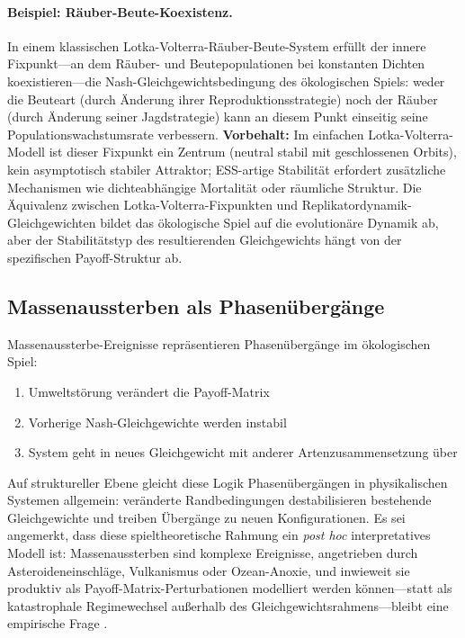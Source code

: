 \documentclass[12pt,a4paper]{article}
\theoremstyle{remark}
\begin{document}
\paragraph{Beispiel: R\"auber-Beute-Koexistenz.}
In einem klassischen Lotka-Volterra-R\"auber-Beute-System erf\"ullt der innere Fixpunkt---an dem R\"auber- und Beutepopulationen bei konstanten Dichten koexistieren---die Nash-Gleichgewichtsbedingung des \"okologischen Spiels: weder die Beuteart (durch \"Anderung ihrer Reproduktionsstrategie) noch der R\"auber (durch \"Anderung seiner Jagdstrategie) kann an diesem Punkt einseitig seine Populationswachstumsrate verbessern. \textbf{Vorbehalt:} Im einfachen Lotka-Volterra-Modell ist dieser Fixpunkt ein Zentrum (neutral stabil mit geschlossenen Orbits), kein asymptotisch stabiler Attraktor; ESS-artige Stabilit\"at erfordert zus\"atzliche Mechanismen wie dichteabh\"angige Mortalit\"at oder r\"aumliche Struktur. Die \"Aquivalenz zwischen Lotka-Volterra-Fixpunkten und Replikatordynamik-Gleichgewichten \citep{HofbauerSigmund1998} bildet das \"okologische Spiel auf die evolution\"are Dynamik ab, aber der Stabilit\"atstyp des resultierenden Gleichgewichts h\"angt von der spezifischen Payoff-Struktur ab.

\subsection{Massenaussterben als Phasen\"uberg\"ange}

Massenaussterbe-Ereignisse repr\"asentieren Phasen\"uberg\"ange im \"okologischen Spiel:
\begin{enumerate}
    \item Umweltst\"orung ver\"andert die Payoff-Matrix
    \item Vorherige Nash-Gleichgewichte werden instabil
    \item System geht in neues Gleichgewicht mit anderer Artenzusammensetzung \"uber
\end{enumerate}

Auf struktureller Ebene gleicht diese Logik Phasen\"uberg\"angen in physikalischen Systemen allgemein: ver\"anderte Randbedingungen destabilisieren bestehende Gleichgewichte und treiben \"Uberg\"ange zu neuen Konfigurationen. Es sei angemerkt, dass diese spieltheoretische Rahmung ein \emph{post hoc} interpretatives Modell ist: Massenaussterben sind komplexe Ereignisse, angetrieben durch Asteroideneinschl\"age, Vulkanismus oder Ozean-Anoxie, und inwieweit sie produktiv als Payoff-Matrix-Perturbationen modelliert werden k\"onnen---statt als katastrophale Regimewechsel au\ss{}erhalb des Gleichgewichtsrahmens---bleibt eine empirische Frage \citep{GouldEldredge1977}.
\end{document}
